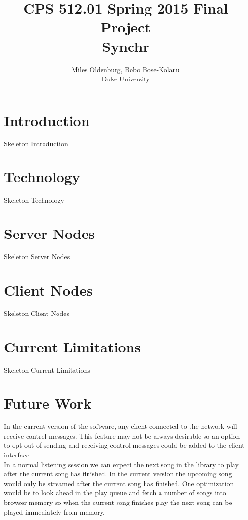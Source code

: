 \documentclass[12pt]{article}
\title{CPS 512.01 Spring 2015 Final Project \\ Synchr}
\author{Miles Oldenburg, Bobo Bose-Kolanu \\ Duke University}
\begin{document}
\maketitle

\newpage

\tableofcontents

\newpage

\section{Introduction}

Skeleton Introduction

\section{Technology}

Skeleton Technology

\section{Server Nodes}

Skeleton Server Nodes

\section{Client Nodes}

Skeleton Client Nodes

\section{Current Limitations}

Skeleton Current Limitations

\section{Future Work}

In the current version of the software, any client connected to the network will receive control messages. This feature may not be always desirable so an option to opt out of sending and receiving control messages could be added to the client interface.
\\

In a normal listening session we can expect the next song in the library to play after the current song has finished. In the current version the upcoming song would only be streamed after the current song has finished. One optimization would be to look ahead in the play queue and fetch a number of songs into browser memory so when the current song finishes play the next song can be played immediately from memory.
\end{document}
